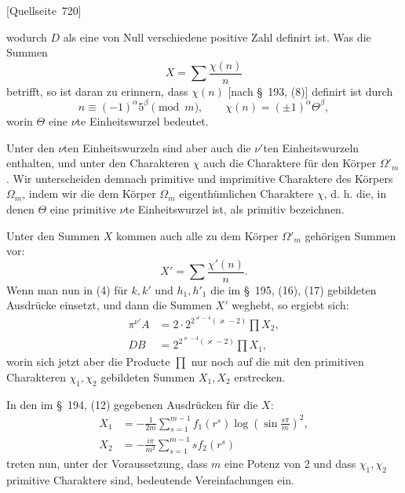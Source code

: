 \documentclass[11pt]{article}
\newcommand{\srcpage}[1]{\par\medskip\noindent\textsf{[Quellseite~#1]}\par\smallskip}
\begin{document}
\srcpage{720}
wodurch $D$ als eine von Null verschiedene positive Zahl definirt ist. Was die Summen
\[
X=\sum\frac{\chi(n)}{n}
\]
betrifft, so ist daran zu erinnern, dass $\chi(n)$ [nach \S~193, (8)] definirt ist durch
\begin{equation}
n\equiv(-1)^\alpha5^\beta\pmod m,
\qquad
\chi(n)=(\pm1)^\alpha\Theta^\beta,
\tag{7}
\end{equation}
worin $\Theta$ eine $\nu$te Einheitswurzel bedeutet.

Unter den $\nu$ten Einheitswurzeln sind aber auch die $\nu'$ten Einheitswurzeln enthalten, und unter den Charakteren $\chi$ auch die Charaktere für den Körper $\Omega'_m$. Wir unterscheiden demnach primitive und imprimitive Charaktere des Körpers $\Omega_m$, indem wir die dem Körper $\Omega_m$ eigenthümlichen Charaktere $\chi$, d. h. die, in denen $\Theta$ eine primitive $\nu$te Einheitswurzel ist, als primitiv bezeichnen.

Unter den Summen $X$ kommen auch alle zu dem Körper $\Omega'_m$ gehörigen Summen vor:
\[
X'=\sum\frac{\chi'(n)}{n}.
\]
Wenn man nun in (4) für $k,k'$ und $h_1,h'_1$ die im \S~195, (16), (17) gebildeten Ausdrücke einsetzt, und dann die Summen $X'$ weghebt, so ergiebt sich:
\begin{equation}
\begin{aligned}
\pi^{\nu'}A&=2\cdot2^{2^{\varkappa-4}(\varkappa-2)}\prod X_2,\\
DB&=2^{2^{\varkappa-4}(\varkappa-2)}\prod X_1,
\end{aligned}
\tag{8}
\end{equation}
worin sich jetzt aber die Producte $\prod$ nur noch auf die mit den primitiven Charakteren $\chi_1,\chi_2$ gebildeten Summen $X_1,X_2$ erstrecken.

In den im \S~194, (12) gegebenen Ausdrücken für die $X$:
\begin{equation}
\begin{aligned}
X_1&=-\frac1{2m}\sum_{s=1}^{m-1} f_1(r^s)\log\left(\sin\frac{s\pi}{m}\right)^2,\\
X_2&=-\frac{i\pi}{m^2}\sum_{s=1}^{m-1}s f_2(r^s)
\end{aligned}
\tag{9}
\end{equation}
treten nun, unter der Voraussetzung, dass $m$ eine Potenz von 2 und dass $\chi_1,\chi_2$ primitive Charaktere sind, bedeutende Vereinfachungen ein.
\end{document}
